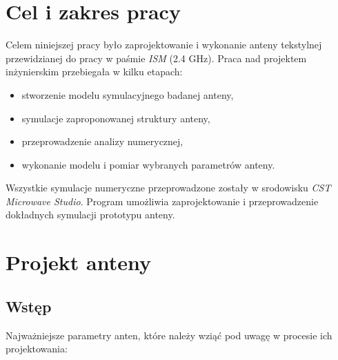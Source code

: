  \chapter{Cel i zakres pracy}

Celem niniejszej pracy było zaprojektowanie i wykonanie anteny tekstylnej przewidzianej do pracy w paśmie \emph{ISM} (2.4 GHz). 
Praca nad projektem inżynierskim przebiegała w kilku etapach:

\begin{itemize}\setlength{\itemsep}{0pt}
	
	\item stworzenie modelu symulacyjnego badanej anteny,

	\item symulacje zaproponowanej struktury anteny,

	\item przeprowadzenie analizy numerycznej,

	\item wykonanie modelu i pomiar wybranych parametrów anteny.

\end{itemize}

Wszystkie symulacje numeryczne przeprowadzone zostały w srodowisku \emph{CST Microwave Studio}. Program umożliwia zaprojektowanie i przeprowadzenie dokładnych symulacji prototypu anteny.


\chapter {Projekt anteny}

\section{Wstęp}

\noindent Najważniejsze parametry anten, które należy wziąć pod uwagę w procesie ich projektowania:

